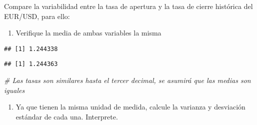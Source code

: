 \documentclass[
]{book}
\newenvironment{Shaded}{\begin{snugshade}}{\end{snugshade}}
\newcommand{\CommentTok}[1]{\textcolor[rgb]{0.56,0.35,0.01}{\textit{#1}}}
\newcommand{\FunctionTok}[1]{\textcolor[rgb]{0.00,0.00,0.00}{#1}}
\newcommand{\NormalTok}[1]{#1}
\newcommand{\SpecialCharTok}[1]{\textcolor[rgb]{0.00,0.00,0.00}{#1}}
\providecommand{\tightlist}{%
  \setlength{\itemsep}{0pt}\setlength{\parskip}{0pt}}
\begin{document}
Compare la variabilidad entre la tasa de apertura y la tasa de cierre histórica del EUR/USD, para ello:

\begin{enumerate}
\def\labelenumi{\arabic{enumi}.}
\tightlist
\item
  Verifique la media de ambas variables la misma
\end{enumerate}

\begin{Shaded}
\end{Shaded}

\begin{verbatim}
## [1] 1.244338
\end{verbatim}

\begin{Shaded}
\end{Shaded}

\begin{verbatim}
## [1] 1.244363
\end{verbatim}

\begin{Shaded}
\begin{Highlighting}[]
\CommentTok{\# Las tasas son similares hasta el tercer decimal, se asumirá que las medias son iguales}
\end{Highlighting}
\end{Shaded}

\begin{enumerate}
\def\labelenumi{\arabic{enumi}.}
\setcounter{enumi}{1}
\tightlist
\item
  Ya que tienen la misma unidad de medida, calcule la varianza y desviación estándar de cada una. Interprete.
\end{enumerate}

\begin{Shaded}
\end{Shaded}
\end{document}
